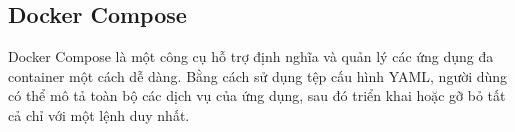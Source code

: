 







\subsection{Docker Compose}

Docker Compose là một công cụ hỗ trợ định nghĩa và quản lý các ứng dụng đa container một cách dễ dàng. Bằng cách sử dụng tệp cấu hình YAML, người dùng có thể mô tả toàn bộ các dịch vụ của ứng dụng, sau đó triển khai hoặc gỡ bỏ tất cả chỉ với một lệnh duy nhất.

